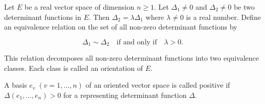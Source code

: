 Let $E$ be a real vector space of dimension $n \geq 1$. Let $\Delta_1 \neq 0$ and $\Delta_2 \neq 0$ be two determinant functions in $E$. Then $\Delta_2 = \lambda \Delta_1$ where $\lambda \neq 0$ is a real number. Define an equivalence relation on the set of all non-zero determinant functions by

$$\Delta_1 \sim \Delta_2 \quad \text{if and only if} \quad \lambda > 0.$$

This relation decomposes all non-zero determinant functions into two equivalence classes. Each class is called an orientation of $E$.

A basis $e_v\;(v = 1, \ldots, n)$ of an oriented vector space is called positive if $\Delta(e_1, \ldots, e_n) > 0$ for a representing determinant function $\Delta$.
